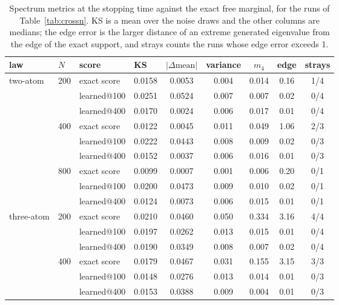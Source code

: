 \documentclass[11pt]{article}
\theoremstyle{plain}
\theoremstyle{definition}
\theoremstyle{remark}
\begin{document}
\begin{table}[h]
\centering
\caption{Spectrum metrics at the stopping time against the exact free marginal, for the runs of Table~\ref{tab:crossn}. KS is a mean over the noise draws and the other columns are medians; the edge error is the larger distance of an extreme generated eigenvalue from the edge of the exact support, and strays counts the runs whose edge error exceeds 1.}
\label{tab:metrics}
\footnotesize
\setlength{\tabcolsep}{3pt}
\begin{tabular}{@{}llllccccc@{}}
\toprule
law & $N$ & score & KS & $|\Delta\text{mean}|$ & variance & $m_4$ & edge & strays\\
\midrule
two-atom & 200 & exact score & 0.0158 & 0.0053 & 0.004 & 0.014 & 0.16 & 1/4\\
 &  & learned@100 & 0.0251 & 0.0524 & 0.007 & 0.007 & 0.02 & 0/4\\
 &  & learned@400 & 0.0170 & 0.0024 & 0.006 & 0.017 & 0.01 & 0/4\\
\addlinespace[2pt]
 & 400 & exact score & 0.0122 & 0.0045 & 0.011 & 0.049 & 1.06 & 2/3\\
 &  & learned@100 & 0.0222 & 0.0443 & 0.008 & 0.009 & 0.02 & 0/3\\
 &  & learned@400 & 0.0152 & 0.0037 & 0.006 & 0.016 & 0.01 & 0/3\\
\addlinespace[2pt]
 & 800 & exact score & 0.0099 & 0.0007 & 0.001 & 0.006 & 0.20 & 0/1\\
 &  & learned@100 & 0.0200 & 0.0473 & 0.009 & 0.010 & 0.02 & 0/1\\
 &  & learned@400 & 0.0124 & 0.0073 & 0.006 & 0.015 & 0.01 & 0/1\\
\midrule
three-atom & 200 & exact score & 0.0210 & 0.0460 & 0.050 & 0.334 & 3.16 & 4/4\\
 &  & learned@100 & 0.0197 & 0.0262 & 0.013 & 0.015 & 0.01 & 0/4\\
 &  & learned@400 & 0.0190 & 0.0349 & 0.008 & 0.007 & 0.02 & 0/4\\
\addlinespace[2pt]
 & 400 & exact score & 0.0179 & 0.0467 & 0.031 & 0.155 & 3.15 & 3/3\\
 &  & learned@100 & 0.0148 & 0.0276 & 0.013 & 0.014 & 0.01 & 0/3\\
 &  & learned@400 & 0.0153 & 0.0388 & 0.009 & 0.004 & 0.01 & 0/3\\
\bottomrule
\end{tabular}
\end{table}
\end{document}

